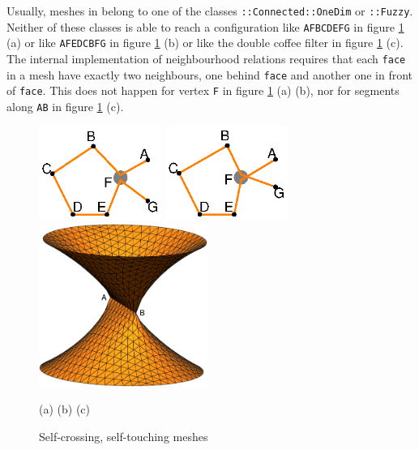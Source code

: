 Usually, meshes in {\maniFEM} belong to one of the classes {\small\tt{}::Connected::OneDim} or
{\small\tt{}::Fuzzy}.
Neither of these classes is able to reach a configuration like {\small\tt AFBCDEFG} in
figure \ref{\numb section 12.\numb fig 10} (a) or like {\small\tt AFEDCBFG} in figure
\ref{\numb section 12.\numb fig 10} (b) or like the double coffee filter in figure
\ref{\numb section 12.\numb fig 10} (c).
The internal implementation of neighbourhood relations requires that each {\small\tt face} in a mesh
have exactly two neighbours, one behind {\small\tt face} and another one in front of {\small\tt face}.
This does not happen for vertex {\small\tt F} in figure \ref{\numb section 12.\numb fig 10} (a) (b),
nor for segments along {\small\tt AB} in figure \ref{\numb section 12.\numb fig 10} (c).

\begin{figure}[ht] \centering
  \includegraphics[width=40mm]{stsi-1}\hskip3mm
  \includegraphics[width=40mm]{stsi-2}
  \includegraphics[width=55mm]{filter}
  \centerline{(a)\hskip40mm (b)\hskip45mm (c)\hglue 15mm}
  \caption{Self-crossing, self-touching meshes}
  \label{\numb section 12.\numb fig 10}
\end{figure}


